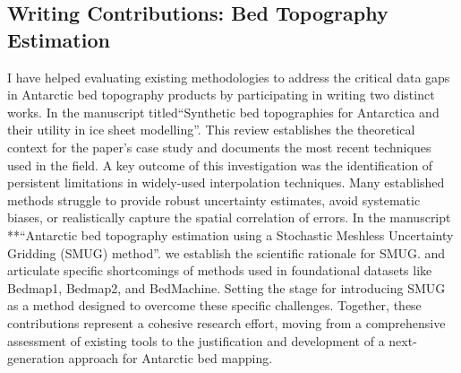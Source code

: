 \subsection{Writing Contributions: Bed Topography Estimation}
I have helped evaluating existing methodologies to address the critical data gaps in Antarctic bed topography products by participating in writing two distinct works. In the manuscript titled``Synthetic bed topographies for Antarctica and their utility in ice sheet modelling''. This review establishes the theoretical context for the paper's case study and documents the most recent techniques used in the field. A key outcome of this investigation was the identification of persistent limitations in widely-used interpolation techniques. Many established methods struggle to provide robust uncertainty estimates, avoid systematic biases, or realistically capture the spatial correlation of errors.
In the manuscript **``Antarctic bed topography estimation using a Stochastic Meshless Uncertainty Gridding (SMUG) method''. we establish the scientific rationale for SMUG. and articulate specific shortcomings of methods used in foundational datasets like Bedmap1, Bedmap2, and BedMachine. Setting the stage for introducing SMUG as a method designed to overcome these specific challenges. Together, these contributions represent a cohesive research effort, moving from a comprehensive assessment of existing tools to the justification and development of a next-generation approach for Antarctic bed mapping.